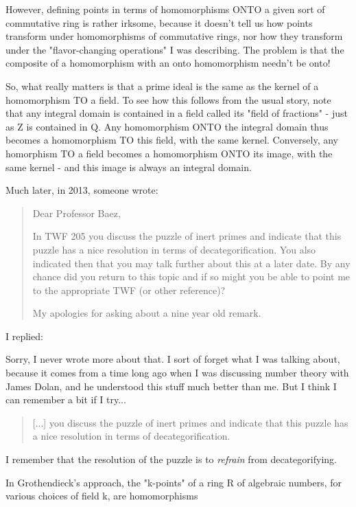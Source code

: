However, defining points in terms of homomorphisms ONTO a given 
sort of commutative ring is rather irksome, because it doesn't 
tell us how points transform under homomorphisms of commutative 
rings, nor how they transform under the "flavor-changing operations" 
I was describing.  The problem is that the composite of a homomorphism 
with an onto homomorphism needn't be onto!

So, what really matters is that a prime ideal is the same as the 
kernel of a homomorphism TO a field.  To see how this follows from 
the usual story, note that any integral domain is contained in a 
field called its "field of fractions" - just as Z is contained in Q.  
Any homomorphism ONTO the integral domain thus becomes a homomorphism 
TO this field, with the same kernel.  Conversely, any homorphism TO 
a field becomes a homomorphism ONTO its image, with the same kernel - 
and this image is always an integral domain.

Much later, in 2013, someone wrote:

\begin{quote}
Dear Professor Baez,

In TWF 205 you discuss the puzzle of inert primes and indicate that
this puzzle has a nice resolution in terms of decategorification.  You
also indicated then that you may talk further about this at a later
date.  By any chance did you return to this topic and if so might you
be able to point me to the appropriate TWF (or other reference)?

My apologies for asking about a nine year old remark.
\end{quote}

I replied:

Sorry, I never wrote more about that.  I sort of forget what I was
talking about, because it comes from a time long ago when I was
discussing number theory with James Dolan, and he understood this
stuff much better than me.  But I think I can remember a bit if I
try...

\begin{quote} [...] you discuss the puzzle of inert primes and indicate
that this puzzle has a nice resolution in terms of decategorification.
\end{quote}
 
I remember that the resolution of the puzzle is to \emph{refrain} from
decategorifying.

In Grothendieck's approach, the "k-points" of a ring R of algebraic
numbers, for various choices of field k, are homomorphisms

